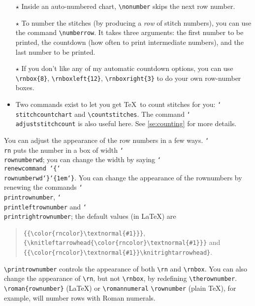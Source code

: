\documentclass[draft]{amsart}
\begin{document}
\begin{itemize}
\item[$\star$] Inside an auto-numbered chart, \verb|\nonumber| skips the next row number.

\item[$\star$] To number the stitches (by producing a \emph{row} of stitch numbers), you can use the command \verb|\numberrow|. It takes three arguments: the first number to be printed, the countdown (how often to print intermediate numbers), and  the last number to be printed.

\item[$\star$] If you don't like any of my automatic countdown options, you can use \verb|\rnbox{8}|, \verb|\rnboxleft{12}|, \verb|\rnboxright{3}| to do your own row-number boxes.

\item Two commands exist to let you get \TeX\ to count stitches for you: \texttt{\char`\\stitch\-count\-chart} and \verb|\countstitches|. The command \texttt{\char`\\ adjust\-stitch\-count} is also useful here. See \autoref{se:counting} for more details.

\end{itemize}

You can adjust the appearance of the row numbers in a few ways. \texttt{\char`\\ rn} puts the number
in a box of width \texttt{\char`\\ rownumberwd}; you can change the
width by saying 
\texttt{\char`\\renewcommand\allowbreak
	\char`\{\char`\\rownumberwd\char`\}\char`\{1em\char`\}}.
You can change the appearance of the rownumbers by renewing the commands \texttt{\char`\\ printrownumber}, \texttt{\char`\\ printleftrownumber} and \texttt{\char`\\ printrightrownumber}; the default values (in \LaTeX) are 
\begin{quote}
\verb|{{\color{rncolor}\textnormal{#1}}}|,\\
\verb|{\knitleftarrowhead{\color{rncolor}\textnormal{#1}}}| and\\
\verb|{{\color{rncolor}\textnormal{#1}}\knitrightarrowhead}|.
\end{quote}

\verb|\printrownumber| controls the appearance of both \verb|\rn| and \verb|\rnbox|. You can also change the appearance of \verb|\rn|, but not \verb|\rnbox|, by redefining  \verb|\therownumber|. \verb|\roman{rownumber}| (\LaTeX) or \verb|\romannumeral| \verb|\rownumber| (plain \TeX), for example, will number rows with Roman numerals.
\end{document}
